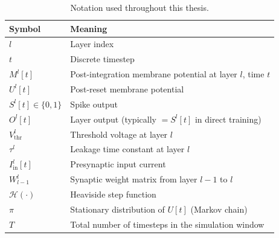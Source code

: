 \begin{table}[h!]
\centering
\small
\begin{tabular}{l l}
\toprule
\textbf{Symbol} & \textbf{Meaning} \\
\midrule
$l$ & Layer index \\
$t$ & Discrete timestep \\
$M^{l}[t]$ & Post-integration membrane potential at layer $l$, time $t$ \\
$U^{l}[t]$ & Post-reset membrane potential \\
$S^{l}[t]\in\{0,1\}$ & Spike output \\
$O^{l}[t]$ & Layer output (typically $=S^{l}[t]$ in direct training) \\
$V^{l}_{\text{thr}}$ & Threshold voltage at layer $l$ \\
$\tau^{l}$ & Leakage time constant at layer $l$ \\
$I^{l}_{\text{in}}[t]$ & Presynaptic input current \\
$W_{l-1}^{l}$ & Synaptic weight matrix from layer $l\!-\!1$ to $l$ \\
$\mathcal{H}(\cdot)$ & Heaviside step function \\
$\pi$ & Stationary distribution of $U[t]$ (Markov chain) \\
$T$ & Total number of timesteps in the simulation window \\
\bottomrule
\end{tabular}
\caption{Notation used throughout this thesis.}
\label{tab:notation}
\end{table}
